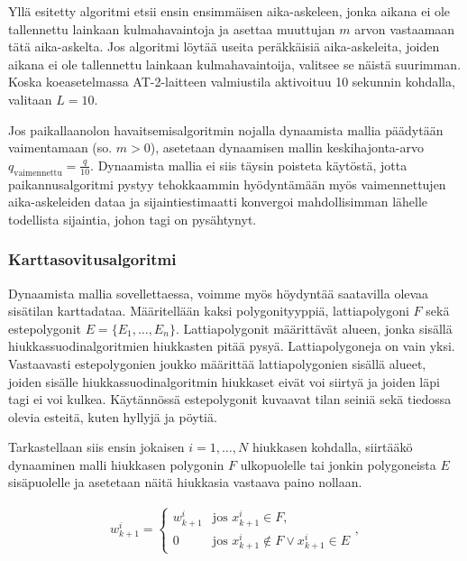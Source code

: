 \documentclass[
  12pt,
  a4paper, twoside]{book}
\begin{document}
Yllä esitetty algoritmi etsii ensin ensimmäisen aika-askeleen, jonka aikana ei ole tallennettu lainkaan kulmahavaintoja ja asettaa muuttujan \(m\) arvon vastaamaan tätä aika-askelta. Jos algoritmi löytää useita peräkkäisiä aika-askeleita, joiden aikana ei ole tallennettu lainkaan kulmahavaintoija, valitsee se näistä suurimman. Koska koeasetelmassa AT-2-laitteen valmiustila aktivoituu 10 sekunnin kohdalla, valitaan \(L=10\).

Jos paikallaanolon havaitsemisalgoritmin nojalla dynaamista mallia päädytään vaimentamaan (so. \(m>0\)), asetetaan dynaamisen mallin keskihajonta-arvo \(q_{\text{vaimennettu}}=\frac{q}{10}\). Dynaamista mallia ei siis täysin poisteta käytöstä, jotta paikannusalgoritmi pystyy tehokkaammin hyödyntämään myös vaimennettujen aika-askeleiden dataa ja sijaintiestimaatti konvergoi mahdollisimman lähelle todellista sijaintia, johon tagi on pysähtynyt.

\hypertarget{karttasovitusalgoritmi}{%
\subsubsection{Karttasovitusalgoritmi}\label{karttasovitusalgoritmi}}

Dynaamista mallia sovellettaessa, voimme myös höydyntää saatavilla olevaa sisätilan karttadataa. Määritellään kaksi polygonityyppiä, lattiapolygoni \(F\) sekä estepolygonit \(E=\{E_1,\ldots,E_n\}\). Lattiapolygonit määrittävät alueen, jonka sisällä hiukkassuodinalgoritmien hiukkasten pitää pysyä. Lattiapolygoneja on vain yksi. Vastaavasti estepolygonien joukko määrittää lattiapolygonien sisällä alueet, joiden sisälle hiukkassuodinalgoritmin hiukkaset eivät voi siirtyä ja joiden läpi tagi ei voi kulkea. Käytännössä estepolygonit kuvaavat tilan seiniä sekä tiedossa olevia esteitä, kuten hyllyjä ja pöytiä.

Tarkastellaan siis ensin jokaisen \(i=1,\ldots,N\) hiukkasen kohdalla, siirtääkö dynaaminen malli hiukkasen polygonin \(F\) ulkopuolelle tai jonkin polygoneista \(E\) sisäpuolelle ja asetetaan näitä hiukkasia vastaava paino nollaan.

\begin{align}\label{inclusion-polygon}
\displaystyle w^i_{k+1}={\begin{cases}w^i_{k+1}&\text{jos } x^i_{k+1} \in F,\\
0& \text{jos } x^i_{k+1} \notin F \lor x^i_{k+1} \in E \end{cases}}, \end{align}
\end{document}
